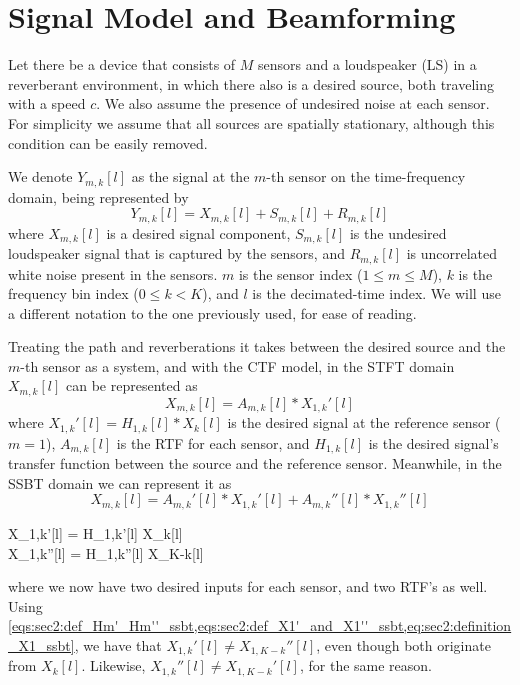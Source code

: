 \section{Signal Model and Beamforming}
\label{sec:signal_model}

Let there be a device that consists of $M$ sensors and a loudspeaker (LS) in a reverberant environment, in which there also is a desired source, both traveling with a speed $c$. We also assume the presence of undesired noise at each sensor. For simplicity we assume that all sources are spatially stationary, although this condition can be easily removed.

We denote $Y_{m,k}[l]$ as the signal at the $m$-th sensor on the time-frequency domain, being represented by
\begin{equation}
	\label{eq:sec3:system_time-freq_domain_base}
	Y_{m,k}[l] = X_{m,k}[l] + S_{m,k}[l] + R_{m,k}[l]
\end{equation}
where $X_{m,k}[l]$ is a desired signal component, $S_{m,k}[l]$ is the undesired loudspeaker signal that is captured by the sensors, and $R_{m,k}[l]$ is uncorrelated white noise present in the sensors. $m$ is the sensor index ($1 \leq m \leq M$), $k$ is the frequency bin index ($0 \leq k < K$), and $l$ is the decimated-time index. We will use a different notation to the one previously used, for ease of reading.

Treating the path and reverberations it takes between the desired source and the $m$-th sensor as a system, and with the CTF model, in the STFT domain $X_{m,k}[l]$ can be represented as
\begin{equation}
	\label{eq:sec3:def_ctf_stft}
	X_{m,k}[l] = A_{m,k}[l] \ast X_{1,k}'[l]
\end{equation}
where $X_{1,k}'[l] = H_{1,k}[l] \ast X_{k}[l]$ is the desired signal at the reference sensor ($m = 1$), $A_{m,k}[l]$ is the RTF for each sensor, and $H_{1,k}[l]$ is the desired signal's transfer function between the source and the reference sensor. Meanwhile, in the SSBT domain we can represent it as
\begin{equation}
	\label{eq:sec3:def_ctf_ssbt}
	X_{m,k}[l] = A_{m,k}'[l] \ast X_{1,k}'[l] + A_{m,k}''[l] \ast X_{1,k}''[l]
\end{equation}\vspace*{-2em}
\begin{subgather}
	X_{1,k}'[l] = H_{1,k}'[l] \ast X_k[l] \\
	X_{1,k}''[l] = H_{1,k}''[l] \ast X_{K-k}[l]
\end{subgather}
where we now have two desired inputs for each sensor, and two RTF's as well. Using \cref{eqs:sec2:def_Hm'_Hm''_ssbt,eqs:sec2:def_X1'_and_X1''_ssbt,eq:sec2:definition_X1_ssbt}, we have that $X_{1,k}'[l] \neq X_{1,K-k}''[l]$, even though both originate from $X_k[l]$. Likewise, $X_{1,k}''[l] \neq X_{1,K-k}'[l]$, for the same reason.

